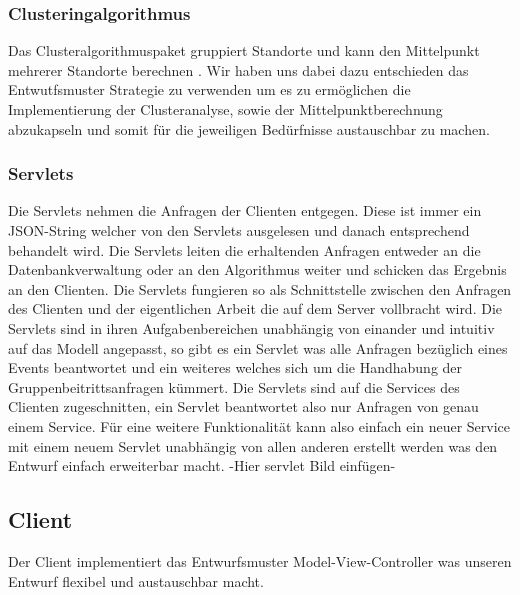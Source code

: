 	\subsubsection{Clusteringalgorithmus}
	Das Clusteralgorithmuspaket gruppiert Standorte und kann den Mittelpunkt mehrerer Standorte berechnen . Wir haben uns dabei dazu entschieden das Entwutfsmuster Strategie zu verwenden um es zu ermöglichen die Implementierung der Clusteranalyse, sowie der Mittelpunktberechnung abzukapseln und somit für die jeweiligen Bedürfnisse austauschbar zu machen.

	\subsubsection{Servlets}
	Die Servlets nehmen die Anfragen der Clienten entgegen. Diese ist immer ein JSON-String welcher von den Servlets ausgelesen und danach entsprechend behandelt wird. Die Servlets leiten die erhaltenden Anfragen entweder an die Datenbankverwaltung oder an den Algorithmus weiter und schicken das Ergebnis an den Clienten.
Die Servlets fungieren so als Schnittstelle zwischen den Anfragen des Clienten und der eigentlichen Arbeit die auf dem Server vollbracht wird. 
Die Servlets sind in ihren Aufgabenbereichen unabhängig von einander und intuitiv auf das Modell angepasst, so gibt es ein Servlet was alle Anfragen bezüglich eines Events beantwortet und ein weiteres welches sich um die Handhabung der Gruppenbeitrittsanfragen kümmert.
Die Servlets sind auf die Services des Clienten zugeschnitten, ein Servlet beantwortet also nur Anfragen von genau einem Service.
Für eine weitere Funktionalität kann also einfach ein neuer Service mit einem neuem Servlet unabhängig von allen anderen erstellt werden was den Entwurf einfach erweiterbar macht.   
-Hier servlet Bild einfügen-

	\subsection{Client}
	Der Client implementiert das Entwurfsmuster Model-View-Controller was unseren Entwurf flexibel und austauschbar macht.
